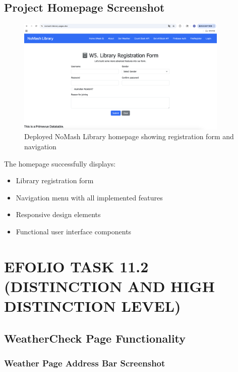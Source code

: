 \documentclass[12pt,a4paper]{article}
\begin{document}
\subsection{Project Homepage Screenshot}

\begin{figure}[H]
\centering
\includegraphics[width=0.9\textwidth]{deployed_homepage.png}
\caption{Deployed NoMash Library homepage showing registration form and navigation}
\end{figure}

The homepage successfully displays:
\begin{itemize}
\item Library registration form
\item Navigation menu with all implemented features
\item Responsive design elements
\item Functional user interface components
\end{itemize}

\newpage

\section{EFOLIO TASK 11.2 (DISTINCTION AND HIGH DISTINCTION LEVEL)}

\subsection{WeatherCheck Page Functionality}

\subsubsection{Weather Page Address Bar Screenshot}
\end{document}
